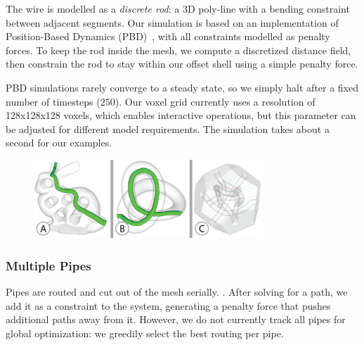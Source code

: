 The wire is modelled as a \emph{discrete rod}: a 3D poly-line with a bending 
constraint between adjacent segments. Our simulation is based on an
implementation of Position-Based Dynamics (PBD)~\cite{Muller07}, with all constraints
modelled as penalty forces. To keep the rod inside the
mesh, we compute a discretized distance field, then constrain the
rod to stay within our offset shell using a simple penalty force. 


PBD simulations rarely converge to a steady state, so we simply halt after a fixed number of timesteps (250). Our voxel grid currently uses a resolution of 128x128x128 voxels, which enables interactive operations, but this parameter can be adjusted for different model requirements. The simulation takes about a second for our examples.

\begin{figure}[h!]
\centering
    \includegraphics[width=3.4in]{figures/routing-tests.png}
\caption{}
\label{fig:complex}
\end{figure}

\subsubsection{Multiple Pipes}
Pipes are routed and cut out of the mesh serially. . After solving for a path, we add it as a constraint to the system, generating
a penalty force that pushes additional paths away from it.  However, we do not currently track all pipes for global optimization: we greedily select the best routing per pipe. 

